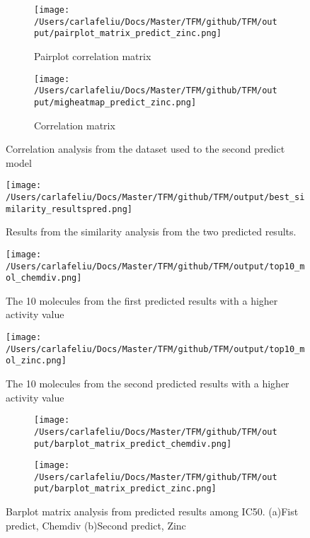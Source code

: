 \documentclass[final,times,twocolumn,article]{elsarticle}
\begin{document}
 \begin{figure}[h]
    \begin{subfigure}{0.5\textwidth}
        \texttt{[image: /Users/carlafeliu/Docs/Master/TFM/github/TFM/output/pairplot\_matrix\_predict\_zinc.png]} 
        \caption{Pairplot correlation matrix}
    \end{subfigure}
    \begin{subfigure}{0.5\textwidth}
        \texttt{[image: /Users/carlafeliu/Docs/Master/TFM/github/TFM/output/migheatmap\_predict\_zinc.png]}
        \caption{Correlation matrix}
    \end{subfigure}
    
    \caption{Correlation analysis from the dataset used to the second predict model}
    \label{Figure11}
\end{figure}

 \begin{figure}[h]
    \centering 
     \texttt{[image: /Users/carlafeliu/Docs/Master/TFM/github/TFM/output/best\_similarity\_resultspred.png]}	
     \caption{Results from the similarity analysis from the two predicted results.} 
     \label{Figure12}
 \end{figure}

 \begin{figure*}[h]
    \centering 
     \texttt{[image: /Users/carlafeliu/Docs/Master/TFM/github/TFM/output/top10\_mol\_chemdiv.png]}	
     \caption{The 10 molecules from the first predicted results with a higher activity value} 
     \label{Figure13*}
 \end{figure*}

 \begin{figure*}[h]
    \centering 
     \texttt{[image: /Users/carlafeliu/Docs/Master/TFM/github/TFM/output/top10\_mol\_zinc.png]}	
     \caption{The 10 molecules from the second predicted results with a higher activity value} 
     \label{Figure14}
 \end{figure*}

 \begin{figure*}[h]
    \centering
    \begin{subfigure}{0.9\textwidth}
        \texttt{[image: /Users/carlafeliu/Docs/Master/TFM/github/TFM/output/barplot\_matrix\_predict\_chemdiv.png]} 
        \caption{}
    \end{subfigure}
    \begin{subfigure}{0.9\textwidth}
        \texttt{[image: /Users/carlafeliu/Docs/Master/TFM/github/TFM/output/barplot\_matrix\_predict\_zinc.png]}
        \caption{}
    \end{subfigure}
    
    \caption{Barplot matrix analysis from predicted results among IC50. (a)Fist predict, Chemdiv (b)Second predict, Zinc }
    \label{Figure15}
\end{figure*}
\end{document}
